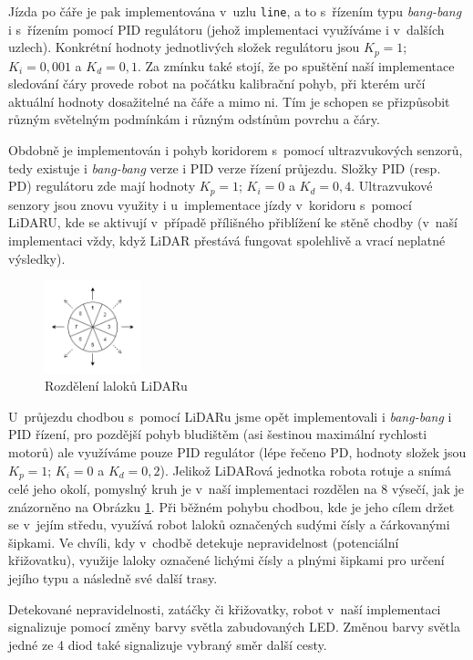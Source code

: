 Jízda po čáře je pak implementována v~uzlu \texttt{line}, a to s~řízením typu \textit{bang-bang} i s~řízením pomocí PID regulátoru (jehož implementaci využíváme i v~dalších uzlech). Konkrétní hodnoty jednotlivých složek regulátoru jsou ${K_p=1}$; ${K_i=0,001}$ a ${K_d=0,1}$. Za zmínku také stojí, že po spuštění naší implementace sledování čáry provede robot na počátku kalibrační pohyb, při kterém určí aktuální hodnoty dosažitelné na čáře a mimo ni. Tím je schopen se přizpůsobit různým světelným podmínkám i různým odstínům povrchu a čáry.

Obdobně je implementován i pohyb koridorem s~pomocí ultrazvukových senzorů, tedy existuje i \textit{bang-bang} verze i PID verze řízení průjezdu. Složky PID (resp. PD) regulátoru zde mají hodnoty ${K_p=1}$; ${K_i=0}$ a ${K_d=0,4}$. Ultrazvukové senzory jsou znovu využity i u~implementace jízdy v~koridoru s~pomocí LiDARU, kde se aktivují v~případě přílišného přiblížení ke stěně chodby (v~naší implementaci vždy, když LiDAR přestává fungovat spolehlivě a vrací neplatné výsledky).

\begin{figure}[h]
    \centering
    \includegraphics[width=0.25\textwidth]{images/lidar_circle.png}
    \caption{Rozdělení laloků LiDARu}
    \label{fig:lidar_obr}
\end{figure}

U~průjezdu chodbou s~pomocí LiDARu jsme opět implementovali i \textit{bang-bang} i PID řízení, pro pozdější pohyb bludištěm (asi šestinou maximální rychlosti motorů) ale využíváme pouze PID regulátor (lépe řečeno PD, hodnoty složek jsou ${K_p=1}$; ${K_i=0}$ a ${K_d=0,2}$). Jelikož LiDARová jednotka robota rotuje a snímá celé jeho okolí, pomyslný kruh je v~naší implementaci rozdělen na 8 výsečí, jak je znázorněno na Obrázku \ref{fig:lidar_obr}. Při běžném pohybu chodbou, kde je jeho cílem držet se v~jejím středu, využívá robot laloků označených sudými čísly a čárkovanými šipkami. Ve chvíli, kdy v~chodbě detekuje nepravidelnost (potenciální křižovatku), využije laloky označené lichými čísly a plnými šipkami pro určení jejího typu a následně své další trasy.

Detekované nepravidelnosti, zatáčky či křižovatky, robot v~naší implementaci signalizuje pomocí změny barvy světla zabudovaných LED. Změnou barvy světla jedné ze 4 diod také signalizuje vybraný směr další cesty.

